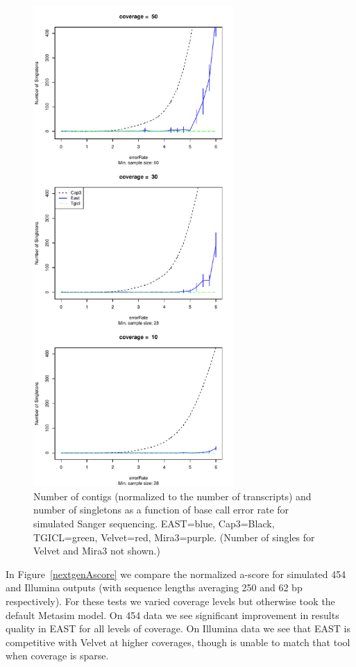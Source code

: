 \documentclass[10pt]{bmc_article}
\newcommand{\capthree} {{\small Cap3}}
\newcommand{\tgicl} {{\small TGICL}}
\newcommand{\east} {{\small EAST}}
\newcommand{\velvet}{{\small Velvet}}
\newcommand{\mira}{{\small Mira3}}
\newenvironment{bmcformat}{\begin{raggedright}\baselineskip20pt\sloppy\setboolean{publ}{false}}{\end{raggedright}\baselineskip20pt\sloppy}
\begin{document}
\begin{bmcformat}
\begin{figure}[htb]
\begin{minipage}{3in}
\includegraphics[width=3in]{pics.d/numSingle_sanger.pdf}
\end{minipage}
\caption{Number of contigs (normalized to the number of transcripts)
  and number of singletons as a function of base call error
  rate for simulated Sanger sequencing.  \east=blue, \capthree=Black,
  \tgicl=green, \velvet=red, \mira=purple.  (Number of singles for
  \velvet\/ and \mira\/ not shown.)}
\label{contigsSanger}
\end{figure}


 In
Figure~\ref{nextgenAscore} we compare the normalized a-score for
simulated 454 and Illumina outputs (with sequence lengths averaging
250 and 62 bp respectively).  For these tests we varied coverage
levels but otherwise took the default Metasim model.  On 454 data we
see significant improvement in results quality in \east\/ for all
levels of coverage.  On Illumina data we see that \east\/ is
competitive with \velvet\/ at higher coverages, though is unable to
match that tool when coverage is sparse.


\end{bmcformat}
\end{document}
